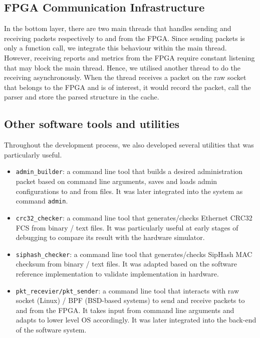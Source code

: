 \documentclass[a4paper]{report}
\newcommand{\code}{\texttt}
\begin{document}
\subsection{FPGA Communication Infrastructure}

In the bottom layer, there are two main threads that handles sending and receiving packets respectively to and from the FPGA. Since sending packets is only a function call, we integrate this behaviour within the main thread. However, receiving reports and metrics from the FPGA require constant listening that may block the main thread. Hence, we utilised another thread to do the receiving asynchronously. When the thread receives a packet on the raw socket that belongs to the FPGA and is of interest, it would record the packet, call the parser and store the parsed structure in the cache.

\subsection{Other software tools and utilities}

Throughout the development process, we also developed several utilities that was particularly useful. 

\begin{itemize}
    \item \code{admin\_builder}: a command line tool that builds a desired administration packet based on command line arguments, saves and loads admin configurations to and from files. It was later integrated into the system as command \code{admin}.
    \item \code{crc32\_checker}: a command line tool that generates/checks Ethernet CRC32 FCS from binary / text files. It was particularly useful at early stages of debugging to compare its result with the hardware simulator.
    \item \code{siphash\_checker}: a command line tool that generates/checks SipHash MAC checksum from binary / text files. It was adapted based on the software reference implementation \cite{aumasson-bernstein-2012} to validate implementation in hardware.
    \item \code{pkt\_recevier/pkt\_sender}: a command line tool that interacts with raw socket (Linux) / BPF (BSD-based systems) to send and receive packets to and from the FPGA. It takes input from command line arguments and adapts to lower level OS accordingly. It was later integrated into the back-end of the software system.
\end{itemize}
\end{document}
